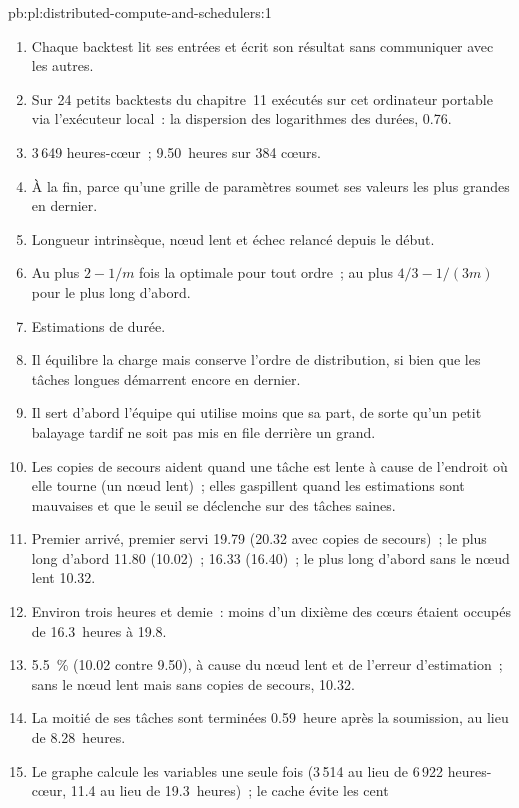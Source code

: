 \begin{solution}{pb:pl:distributed-compute-and-schedulers:1}
\begin{enumerate}
\item Chaque backtest lit ses entrées et écrit son résultat sans communiquer avec les autres.
\item Sur 24 petits backtests du chapitre~11 exécutés sur cet ordinateur portable via l'exécuteur local~: la dispersion des logarithmes des durées, 0.76.
\item 3\,649 heures-cœur~; 9.50~heures sur 384 cœurs.
\item À la fin, parce qu'une grille de paramètres soumet ses valeurs les plus grandes en dernier.
\item Longueur intrinsèque, nœud lent et échec relancé depuis le début.
\item Au plus $2 - 1/m$ fois la  optimale pour tout ordre~; au plus $4/3 - 1/(3m)$ pour le plus long d'abord.
\item Estimations de durée.
\item Il équilibre la charge mais conserve l'ordre de distribution, si bien que les tâches longues démarrent encore en dernier.
\item Il sert d'abord l'équipe qui utilise moins que sa part, de sorte qu'un petit balayage tardif ne soit pas mis en file derrière un grand.
\item Les copies de secours aident quand une tâche est lente à cause de l'endroit où elle tourne (un nœud lent)~; elles gaspillent quand les estimations sont mauvaises et que le seuil se déclenche sur des tâches saines.
\item Premier arrivé, premier servi 19.79 (20.32 avec copies de secours)~; le plus long d'abord 11.80 (10.02)~;  16.33 (16.40)~; le plus long d'abord sans le
nœud lent 10.32.
\item Environ trois heures et demie~: moins d'un dixième des cœurs étaient occupés de 16.3~heures à 19.8.
\item 5.5~\% (10.02 contre 9.50), à cause du nœud lent et de l'erreur d'estimation~; sans le nœud lent mais sans copies de secours, 10.32.
\item La moitié de ses tâches sont terminées 0.59~heure après la soumission, au lieu de 8.28~heures.
\item Le graphe calcule les variables une seule fois (3\,514 au lieu de 6\,922 heures-cœur, 11.4 au lieu de 19.3~heures)~; le cache évite les cent

\end{enumerate}
\end{solution}
